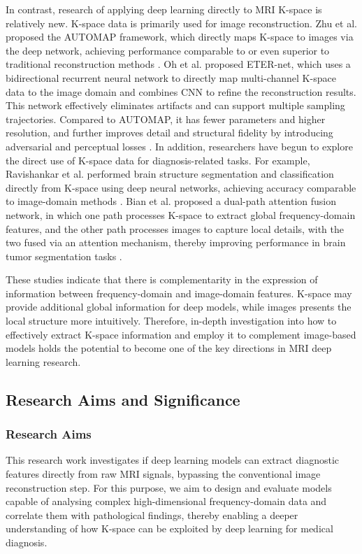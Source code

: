 \documentclass[12pt,a4paper]{article}
\begin{document}
In contrast, research of applying deep learning directly to MRI K-space is relatively new. K-space data is primarily used for image reconstruction. Zhu et al. proposed the AUTOMAP framework, which directly maps K-space to images via the deep network, achieving performance comparable to or even superior to traditional reconstruction methods \cite{12}. Oh et al. proposed ETER-net, which uses a bidirectional recurrent neural network to directly map multi-channel K-space data to the image domain and combines CNN to refine the reconstruction results. This network effectively eliminates artifacts and can support multiple sampling trajectories. Compared to AUTOMAP, it has fewer parameters and higher resolution, and further improves detail and structural fidelity by introducing adversarial and perceptual losses \cite{13}. In addition, researchers have begun to explore the direct use of K-space data for diagnosis-related tasks. For example, Ravishankar et al. performed brain structure segmentation and classification directly from K-space using deep neural networks, achieving accuracy comparable to image-domain methods \cite{14}. Bian et al. proposed a dual-path attention fusion network, in which one path processes K-space to extract global frequency-domain features, and the other path processes images to capture local details, with the two fused via an attention mechanism, thereby improving performance in brain tumor segmentation tasks \cite{15}.

These studies indicate that there is complementarity in the expression of information between frequency-domain and image-domain features. K-space may provide additional global information for deep models, while images presents the local structure more intuitively. Therefore, in-depth investigation into how to effectively extract K-space information and employ it to complement image-based models holds the potential to become one of the key directions in MRI deep learning research.


\subsection{Research Aims and Significance}

\subsubsection{Research Aims}
This research work investigates if deep learning models can extract diagnostic features directly from raw MRI signals, bypassing the conventional image reconstruction step. For this purpose, we aim to design and evaluate models capable of analysing complex high-dimensional frequency-domain data and correlate them with pathological findings, thereby enabling a deeper understanding of how K-space can be exploited by deep learning for medical diagnosis.
\end{document}
